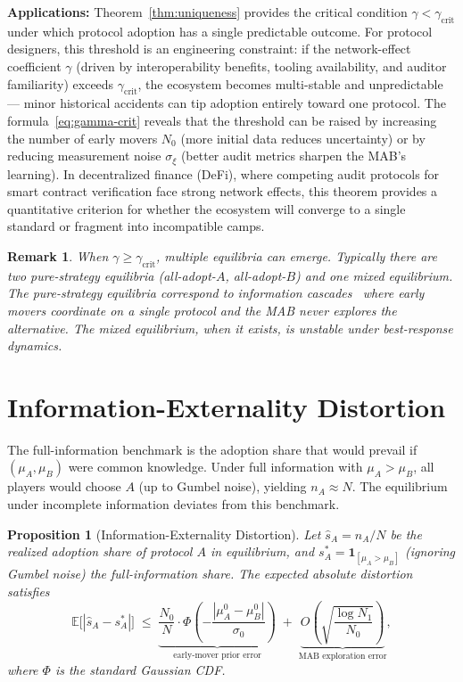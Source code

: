 \documentclass[12pt,a4paper]{article}
\newtheorem{proposition}[theorem]{Proposition}
\newtheorem{remark}[theorem]{Remark}
\newcommand{\E}{\mathbb{E}}
\newcommand{\ind}[1]{\mathbf{1}_{[#1]}}
\begin{document}
\medskip\noindent
\textbf{Applications:}
Theorem~\ref{thm:uniqueness} provides the critical condition
$\gamma<\gamma_{\text{crit}}$ under which protocol adoption has a single
predictable outcome.  For protocol designers, this threshold is an engineering
constraint: if the network-effect coefficient $\gamma$ (driven by
interoperability benefits, tooling availability, and auditor familiarity)
exceeds $\gamma_{\text{crit}}$, the ecosystem becomes multi-stable and
unpredictable — minor historical accidents can tip adoption entirely toward
one protocol.  The formula~\eqref{eq:gamma-crit} reveals that the threshold
can be raised by increasing the number of early movers $N_0$ (more initial
data reduces uncertainty) or by reducing measurement noise $\sigma_\xi$
(better audit metrics sharpen the MAB's learning).  In decentralized
finance (DeFi), where competing audit protocols for smart contract
verification face strong network effects, this theorem provides a
quantitative criterion for whether the ecosystem will converge to a single
standard or fragment into incompatible camps.

\begin{remark}
\label{rem:multiplicity}
When $\gamma\geq\gamma_{\text{crit}}$, multiple equilibria can emerge.
Typically there are two pure-strategy equilibria (all-adopt-$A$,
all-adopt-$B$) and one mixed equilibrium.  The pure-strategy equilibria
correspond to \emph{information cascades}~\citep{bikhchandani1992theory}
where early movers coordinate on a single protocol and the MAB never
explores the alternative.  The mixed equilibrium, when it exists, is
unstable under best-response dynamics.
\end{remark}

\section{Information-Externality Distortion}

The full-information benchmark is the adoption share that would prevail if
$(\mu_A,\mu_B)$ were common knowledge.  Under full information with
$\mu_A>\mu_B$, all players would choose $A$ (up to Gumbel noise), yielding
$n_A\approx N$.  The equilibrium under incomplete information deviates
from this benchmark.

\begin{proposition}[Information-Externality Distortion]
\label{prop:distortion}
Let $\hat{s}_A = n_A/N$ be the realized adoption share of protocol $A$ in
equilibrium, and $s_A^* = \ind{\mu_A>\mu_B}$ (ignoring Gumbel noise) the
full-information share.  The expected absolute distortion satisfies
\begin{equation}\label{eq:distortion}
    \E\!\big[|\hat{s}_A - s_A^*|\big] \;\leq\;
    \underbrace{\frac{N_0}{N}\cdot
        \Phi\!\left(-\frac{|\mu_A^0-\mu_B^0|}{\sigma_0}\right)}_{\text{early-mover prior error}}
    \;+\;
    \underbrace{O\!\left(\sqrt{\frac{\log N_1}{N_0}}\right)}_{\text{MAB exploration error}},
\end{equation}
where $\Phi$ is the standard Gaussian CDF.
\end{proposition}
\end{document}
